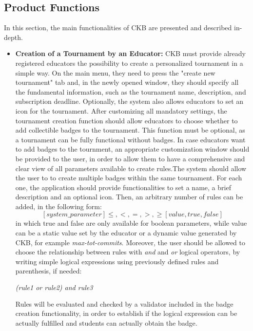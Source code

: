 \documentclass[a4paper, 11pt, titlepage]{article}
\begin{document}
\subsection{Product Functions}
In this section, the main functionalities of CKB are presented and described in-depth.
\begin{itemize}
    \item \textbf{Creation of a Tournament by an Educator:} CKB must provide already registered educators the possibility to create a personalized tournament in a simple way. 
    On the main menu, they need to press the "create new tournament" tab and, in the newly opened window, they should specify all the 
    fundamental information, such as the tournament name, description, and subscription deadline. Optionally, the system also allows educators to set an icon for the tournament. After customizing all mandatory settings, the tournament creation function should allow 
    educators to choose whether to add collectible badges to the tournament. This function must be optional, as a tournament can be fully functional without badges.
    In case educators want to add badges to the tournment, an appropriate customization window should be provided to the user, in order to allow them to have a comprehensive
    and clear view of all parameters available to create rules.The system should allow the user to to create multiple badges within the same tournament. For each one, the application should
    provide functionalities to set a name, a brief description and an optional icon. Then, an arbitrary number of rules can be added, in the following form:
    \[[system\_parameter] \leq,<,=,>,\geq [value,true,false] \]
    in which true and false are only available for boolean parameters, while value can be a static value set by the educator or a dynamic value generated by CKB, for example \textit{max-tot-commits}. Moreover, the user should be allowed to choose the relationship between rules with \textit{and} and \textit{or}
    logical operators, by writing simple logical expressions using previously defined rules and parenthesis, if needed:
    \begin{center}
        \textit{(rule1 or rule2) and rule3}
    \end{center}
    Rules will be evaluated and checked by a validator included in the badge creation functionality, in order to establish if the logical expression can be actually fulfilled and students can actually
    obtain the badge.
    

\end{itemize}
\end{document}
